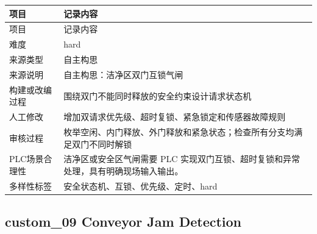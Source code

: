\begin{longtable}{L{3.0cm}L{10.3cm}}

\toprule

项目 & 记录内容\\

\midrule

\endfirsthead

\toprule

项目 & 记录内容\\

\midrule

\endhead

难度 & hard\\

来源类型 & 自主构思\\

来源说明 & 自主构思：洁净区双门互锁气闸\\

构建或改编过程 & 围绕双门不能同时释放的安全约束设计请求状态机\\

人工修改 & 增加双请求优先级、超时复锁、紧急锁定和传感器故障规则\\

审核过程 & 枚举空闲、内门释放、外门释放和紧急状态；检查所有分支均满足双门不同时解锁\\

PLC场景合理性 & 洁净区或安全区气闸需要 PLC 实现双门互锁、超时复锁和异常处理，具有明确现场输入输出。\\

多样性标签 & 安全状态机、互锁、优先级、定时、hard\\

\bottomrule

\end{longtable}

\subsection{{\ttfamily custom\_09} Conveyor Jam Detection}

